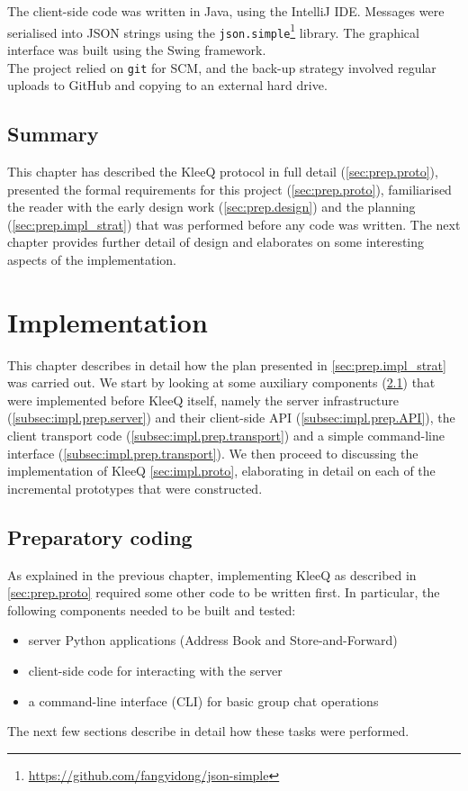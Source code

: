 \documentclass[a4paper, twoside, 12pt]{report}
\begin{document}
The client-side code was written in Java, using the IntelliJ IDE. Messages were serialised into JSON strings using the \texttt{json.simple}\footnote{\url{https://github.com/fangyidong/json-simple}} library. The graphical interface was built using the Swing framework. \\ 

The project relied on \texttt{git} for SCM, and the back-up strategy involved regular uploads to GitHub and copying to an external hard drive.

\section{Summary}
This chapter has described the KleeQ protocol in full detail (\cref{sec:prep.proto}), presented the formal requirements for this project (\cref{sec:prep.proto}), familiarised the reader with the early design work (\cref{sec:prep.design}) and the planning (\cref{sec:prep.impl_strat}) that was performed before any code was written. The next chapter provides further detail of design and elaborates on some interesting aspects of the implementation.


\chapter{Implementation}
This chapter describes in detail how the plan presented in \cref{sec:prep.impl_strat} was carried out. We start by looking at some auxiliary components (\cref{sec:impl.prep}) that were implemented before KleeQ itself, namely the server infrastructure (\cref{subsec:impl.prep.server}) and their client-side API (\cref{subsec:impl.prep.API}), the client transport code (\cref{subsec:impl.prep.transport}) and a simple command-line interface (\cref{subsec:impl.prep.transport}). We then proceed to discussing the implementation of KleeQ \cref{sec:impl.proto}, elaborating in detail on each of the incremental prototypes that were constructed.


\section{Preparatory coding}
\label{sec:impl.prep}
As explained in the previous chapter, implementing KleeQ as described in \cref{sec:prep.proto} required some other code to be written first. In particular, the following components needed to be built and tested:
\begin{itemize}
    \item server Python applications (Address Book and Store-and-Forward)
    \item client-side code for interacting with the server
    \item a command-line interface (CLI) for basic group chat operations
\end{itemize}
The next few sections describe in detail how these tasks were performed.
\end{document}
